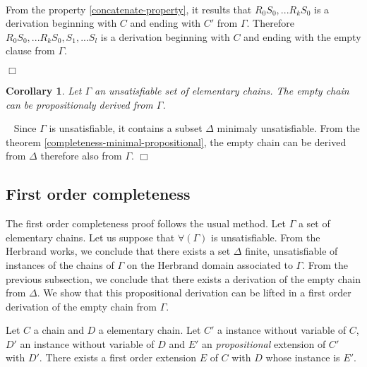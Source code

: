\documentclass{article}
\newtheorem{corollaire}[theoreme]{Corollary}
\newenvironment{preuve}{\noindent {\em Proof :}\ }{{\hfill
    $\Box$}\vspace{.5pc}} \newcommand{\sg}{\!\!<\!\!}
\begin{document}
\begin{preuve}
\begin{itemrond}
From the property \ref{concatenate-property}, it results that $R_0S_0,...R_kS_0$ is a derivation beginning with $C$
and ending with $C'$ from $\Gamma$. Therefore $R_0S_0,...R_kS_0,S_1,...S_l$ is a derivation beginning with $C$ and
ending with the empty clause from $\Gamma$.

\end{itemrond}

\end{preuve}

\begin{corollaire}\label{completeness-propositional}
Let $\Gamma$ an unsatisfiable set of elementary chains. The empty chain can be propositionaly derived from $\Gamma$.
\end{corollaire}

\begin{preuve}
Since $\Gamma$ is unsatisfiable, it contains a subset $\Delta$ minimaly unsatisfiable. 
From the theorem \ref{completeness-minimal-propositional}, the empty chain can be derived from $\Delta$ therefore also
from $\Gamma$.
\end{preuve}





\subsection{First order completeness}

The first order completeness proof follows the usual method. Let $\Gamma$ a set of elementary chains.
Let us suppose that $\forall(\Gamma)$ is unsatisfiable. From the Herbrand works, we conclude   
that there exists a set $\Delta$ finite, unsatisfiable of instances  of the chains of $\Gamma$ on the Herbrand domain
associated to $\Gamma$. From the previous subsection, we conclude that there exists a derivation of the empty chain 
from $\Delta$. We show that this propositional derivation can be lifted in a first order derivation of the empty chain from 
$\Gamma$.

\begin{lemme}\label{lifting-extension}
Let $C$ a chain and $D$ a elementary chain. Let $C'$ a instance without variable of $C$, $D'$ an instance without variable
of $D$ and $E'$ an \emph{propositional} extension of $C'$ with $D'$. There exists a first order extension $E$ of $C$ with $D$
whose instance is $E'$.
\end{lemme}
\end{document}
